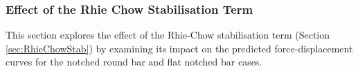 \documentclass[sn-mathphys,Numbered]{sn-jnl}%
\begin{document}
\subsubsection{Effect of the Rhie Chow Stabilisation Term} \label{sec:RhieChowResults}
This section explores the effect of the Rhie-Chow stabilisation term (Section \ref{sec:RhieChowStab}) by examining its impact on the predicted force-displacement curves for the notched round bar and flat notched bar cases.

\end{document}
